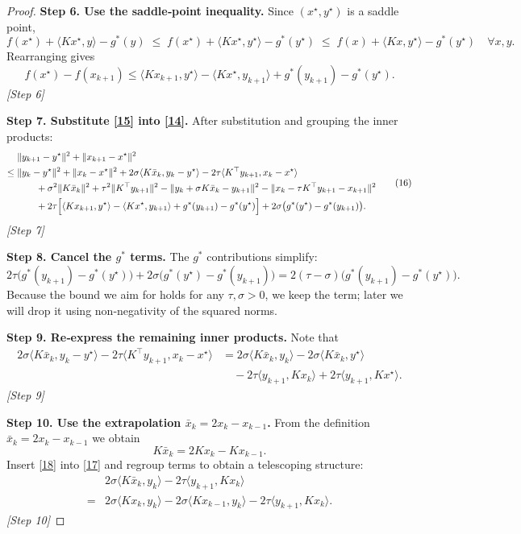 \documentclass{article}
\begin{document}
\begin{proof}
\textbf{Step 6. Use the saddle‑point inequality.}  
Since $(x^{\star},y^{\star})$ is a saddle point,
\[
f(x^{\star})+ \langle Kx^{\star},y\rangle - g^{*}(y)
\;\le\;
f(x^{\star})+ \langle Kx^{\star},y^{\star}\rangle - g^{*}(y^{\star})
\;\le\;
f(x)+ \langle Kx,y^{\star}\rangle - g^{*}(y^{\star})
\quad\forall x,y.
\]
Rearranging gives
\[
f(x^{\star})-f(x_{k+1}) \le \langle Kx_{k+1},y^{\star}\rangle - \langle Kx^{\star},y_{k+1}\rangle + g^{*}(y_{k+1})-g^{*}(y^{\star}).
\tag{15}
\]
\textit{[Step 6]}

\textbf{Step 7. Substitute \eqref{15} into \eqref{14}.}  
After substitution and grouping the inner products:
\[
\begin{aligned}
&\|y_{k+1}-y^{\star}\|^{2}+\|x_{k+1}-x^{\star}\|^{2}\\
\le\;&\|y_{k}-y^{\star}\|^{2}+\|x_{k}-x^{\star}\|^{2}
+2\sigma\langle K\bar{x}_{k},y_{k}-y^{\star}\rangle
-2\tau\langle K^{\top}y_{k+1},x_{k}-x^{\star}\rangle\\
&\qquad +\sigma^{2}\|K\bar{x}_{k}\|^{2}
+\tau^{2}\|K^{\top}y_{k+1}\|^{2}
- \|y_{k}+\sigma K\bar{x}_{k}-y_{k+1}\|^{2}
- \|x_{k}-\tau K^{\top}y_{k+1}-x_{k+1}\|^{2}\\
&\qquad +2\tau\Bigl[\langle Kx_{k+1},y^{\star}\rangle-\langle Kx^{\star},y_{k+1}\rangle
+g^{*}(y_{k+1})-g^{*}(y^{\star})\Bigr]
+2\sigma\bigl(g^{*}(y^{\star})-g^{*}(y_{k+1})\bigr).
\end{aligned}
\tag{16}
\]
\textit{[Step 7]}

\textbf{Step 8. Cancel the $g^{*}$ terms.}  
The $g^{*}$ contributions simplify:
\[
2\tau\bigl(g^{*}(y_{k+1})-g^{*}(y^{\star})\bigr)
+2\sigma\bigl(g^{*}(y^{\star})-g^{*}(y_{k+1})\bigr)
=2(\tau-\sigma)\bigl(g^{*}(y_{k+1})-g^{*}(y^{\star})\bigr).
\]
Because the bound we aim for holds for any $\tau,\sigma>0$, we keep the term; later we will drop it using non‑negativity of the squared norms.  

\textbf{Step 9. Re‑express the remaining inner products.}  
Note that
\[
\begin{aligned}
2\sigma\langle K\bar{x}_{k},y_{k}-y^{\star}\rangle
-2\tau\langle K^{\top}y_{k+1},x_{k}-x^{\star}\rangle
&=2\sigma\langle K\bar{x}_{k},y_{k}\rangle-2\sigma\langle K\bar{x}_{k},y^{\star}\rangle\\
&\quad-2\tau\langle y_{k+1},Kx_{k}\rangle+2\tau\langle y_{k+1},Kx^{\star}\rangle .
\end{aligned}
\tag{17}
\]
\textit{[Step 9]}

\textbf{Step 10. Use the extrapolation $\bar{x}_{k}=2x_{k}-x_{k-1}$.}  
From the definition $\bar{x}_{k}=2x_{k}-x_{k-1}$ we obtain
\[
K\bar{x}_{k}=2Kx_{k}-Kx_{k-1}.
\tag{18}
\]
Insert \eqref{18} into \eqref{17} and regroup terms to obtain a telescoping structure:
\[
\begin{aligned}
&2\sigma\langle K\bar{x}_{k},y_{k}\rangle-2\tau\langle y_{k+1},Kx_{k}\rangle\\
=&2\sigma\langle Kx_{k},y_{k}\rangle-2\sigma\langle Kx_{k-1},y_{k}\rangle
-2\tau\langle y_{k+1},Kx_{k}\rangle.
\end{aligned}
\tag{19}
\]
\textit{[Step 10]}


\end{proof}
\end{document}

